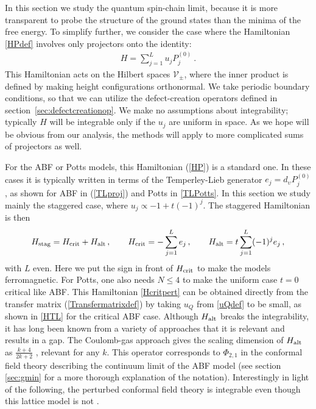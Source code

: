 In this section we study the quantum spin-chain limit, because it is more transparent to probe the structure of the ground states than the minima of the free energy. To simplify further, we consider the case where the Hamiltonian \eqref{HPdef} involves only projectors onto the identity:
\begin{align}
H = \sum_{j=1}^L u_j P^{(0)}_j\ .
\label{HP}
\end{align}
This  Hamiltonian acts on the Hilbert spaces $\mathcal{V}_\pm$, where the inner product is defined by making height configurations orthonormal.
We take periodic boundary conditions, so that we can utilize the defect-creation operators defined in section~\ref{sec:defectcreationop}.
We make no assumptions about integrability; typically $H$ will be integrable only if the $u_j$ are uniform in space. As we hope will be obvious from our analysis, the methods will apply to more complicated sums of projectors as well. 

For the ABF or Potts models, this Hamiltonian (\ref{HP}) is a standard one. In these cases it is typically written in terms of the Temperley-Lieb generator $e_j=d_{\upsilon}P^{(0)}_j$, as shown for ABF in (\ref{TLproj}) and Potts in \eqref{TLPotts}. In this section we study mainly the staggered case, where $u_j \propto -1 +t(-1)^j$. 
The staggered Hamiltonian is then
\begin{align} 
H_{\rm stag} = 
H_{\rm crit}+H_{\rm alt} \,,\qquad H_{\rm crit} = -\sum_{j=1}^L e_j \,,\qquad H_{\rm alt} = t\sum_{j=1}^L(-1)^j e_j \,,
\label{Hcritpert}
\end{align}
with $L$ even. Here we put the sign in front of $H_{\rm crit}$ to make the models ferromagnetic. For Potts, one also needs $N\le 4$ to make the uniform case $t=0$ critical like ABF. This Hamiltonian \eqref{Hcritpert} can be obtained directly from the transfer matrix (\ref{Transfermatrixdef}) by taking $u_Q$ from \eqref{uQdef} to be small, as shown in \eqref{HTL} for the critical ABF case.
Although $H_{\rm alt}$ breaks the integrability, it has long been known from a variety of approaches that it is relevant and results in a gap.
The Coulomb-gas approach gives the scaling dimension of $H_{\rm alt}$ as $\frac{k+4}{2k+2}$ \cite{denNijs1979}, relevant for any $k$. This operator corresponds to $\Phi_{2,1}$ in the conformal field theory describing the continuum limit of the ABF model \cite{Pasquier:1987} (see section \ref{sec:gmin} for a more thorough explanation of the notation). Interestingly in light of the following, the perturbed conformal field theory is integrable even though this lattice model is not \cite{Smirnov1991,Chim1991}.




